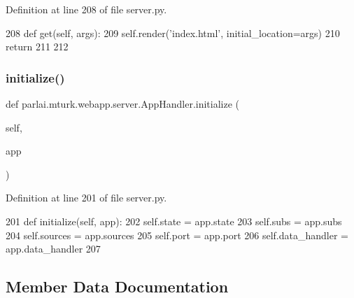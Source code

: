 Definition at line 208 of file server.\+py.


\begin{DoxyCode}
208     \textcolor{keyword}{def }get(self, args):
209         self.render(\textcolor{stringliteral}{'index.html'}, initial\_location=args)
210         \textcolor{keywordflow}{return}
211 
212 
\end{DoxyCode}
\mbox{\label{classparlai_1_1mturk_1_1webapp_1_1server_1_1AppHandler_aeebc2d7f949d09ad85a9f93bb9058857}} 
\subsubsection{\texorpdfstring{initialize()}{initialize()}}
{\footnotesize\ttfamily def parlai.\+mturk.\+webapp.\+server.\+App\+Handler.\+initialize (\begin{DoxyParamCaption}\item[{}]{self,  }\item[{}]{app }\end{DoxyParamCaption})}



Definition at line 201 of file server.\+py.


\begin{DoxyCode}
201     \textcolor{keyword}{def }initialize(self, app):
202         self.state = app.state
203         self.subs = app.subs
204         self.sources = app.sources
205         self.port = app.port
206         self.data\_handler = app.data\_handler
207 
\end{DoxyCode}


\subsection{Member Data Documentation}
\mbox{\label{classparlai_1_1mturk_1_1webapp_1_1server_1_1AppHandler_ac635a7095f1cf851b4b33cca5d6d081b}} 
